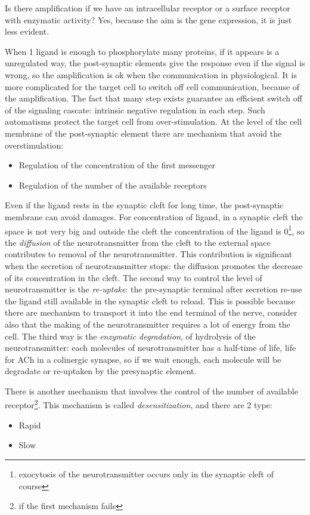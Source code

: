 \documentclass[a4paper, 12pt]{book}
\begin{document}
Is there amplification if we have an intracellular receptor or a surface receptor with enzymatic activity? Yes, because the aim is the gene expression, it is just less evident. 

When 1 ligand is enough to phosphorylate many proteins, if it appears is a unregulated way, the post-synaptic elements give the response even if the signal is wrong, so the amplification is ok when the communication in physiological. It is more complicated for the target cell to switch off cell communication, because of the amplification. 
The fact that many step exists guarantee an efficient switch off of the signaling cascate: intrinsic negative regulation in each step. Such automatisms protect the target cell from over-stimulation. At the level of the cell membrane of the post-synaptic element there are mechanism that avoid the overstimulation:
\begin{itemize}
\item{Regulation of the concentration of the first messenger}
\item{Regulation of the number of the available receptors}
\end{itemize}

Even if the ligand rests in the synaptic cleft for long time, the post-synaptic membrane can avoid damages. For concentration of ligand, in a synaptic cleft the space is not very big and outside the cleft the concentration of the ligand is 0\footnote{exocytosis of the neurotransmitter occurs only in the synaptic cleft of course}, so the \emph{diffusion} of the neurotransmitter from the cleft to the external space contributes to removal of the neurotransmitter. This contribution is significant when the secretion of neurotransmitter stops: the diffusion promotes the decrease of its concentration in the cleft.  The second way to control the level of neurotransmitter is the \emph{re-uptake}: the pre-synaptic terminal after secretion re-use the ligand still available in the synaptic cleft to reload. This is possible because there are mechanism to transport it into the end terminal of the nerve, consider also that the making of the neurotransmitter requires a lot of energy from the cell. The third way is the \emph{enzymatic degradation}, of hydrolysis of the neurotransmitter: each molecules of neurotransmitter has a half-time of life, life for ACh in a colinergic synapse, so if we wait enough, each molecule will be degradate or re-uptaken by the presynaptic element.

There is another mechanism that involves the control of the number of available receptor\footnote{if the first mechanism fails}. This mechanism is called \emph{desensitization}, and there are 2 type: 
\begin{itemize}
\item{Rapid}
\item{Slow}
\end{itemize}
\end{document}
